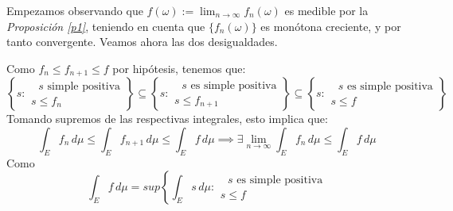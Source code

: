 \documentclass[11pt, a4paper]{article}
\makeatletter
\newif\IfInSansMode
\let\oldsf\sffamily
\renewcommand*{\sffamily}{\oldsf\mathversion{sans}\InSansModetrue}
\let\oldnorm\normalfont
\renewcommand*{\normalfont}{\oldnorm\InSansModefalse\mathversion{normal}}
\renewenvironment{proof}[1][\proofname] {\par\pushQED{\qed}\normalfont\topsep6\p@\@plus6\p@\relax\trivlist\item[\hskip\labelsep\itshape\sffamily#1\@addpunct{.}]\ignorespaces}{\popQED\endtrivlist\@endpefalse}
\theoremstyle{theorem-style}
\theoremstyle{definition-style}
\theoremstyle{remark-style}
\theoremstyle{example-style}
\makeatother
\begin{document}
  \begin{proof} Empezamos observando que $\displaystyle f(\omega):= \lim _{n\to \infty} f_n(\omega)$ es medible por la \textit{Proposición \ref{p1}}, teniendo en cuenta que $\{f_n(\omega)\}$ es monótona creciente, y por tanto convergente. Veamos ahora las dos desigualdades.

    \boxed{\geq} Como $f_n \leq f_{n+1} \leq f$ por hipótesis, tenemos que:
    \[
    \left\{ s  : \begin{array}{r} \text{ $s$ simple positiva}\\
        s \leq f_n 
      \end{array}\right\}  \subseteq \left\{ s: \begin{array}{r} \text{ $s$ es simple positiva}\\
        s\leq f_{n+1}
	
      \end{array} \right\} \subseteq \left\{s: \begin{array}{r}\text{ $s$ es simple positiva}\\ s \leq f
	
      \end{array}\right\}
    \]
    Tomando supremos de las respectivas integrales, esto implica que:
    \[
      \int_E f_n\, d \mu \leq \int_E f_{n+1}\, d\mu \leq \int_E f\, d \mu \implies \exists \lim_{n\to \infty} \int_E f_n\, d\mu \leq \int_E f\, d \mu
    \]
    \boxed{\leq} Como
    \[
      \int_E f\, d \mu = sup \left\{\int_E s\, d\mu : \begin{array}{r} \text{ $s$ es simple positiva}\\
        s \leq f
	

\end{array}\]
\end{proof}
\end{document}
